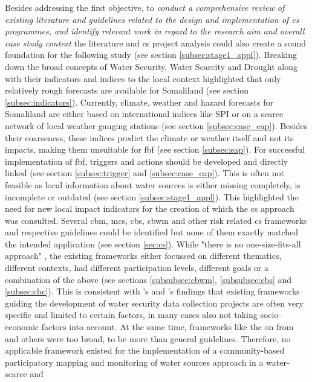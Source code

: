 
Besides addressing the first objective, to \textit{conduct a comprehensive review of existing literature and guidelines related to the design and implementation of \acrlong{cs} programmes, and identify relevant work in regard to the research aim and overall case study context} the literature and \acrshort{cs} project analysis could also create a sound foundation for the following study (see section \ref{subsec:stage1_appl}). %
Breaking down the broad concepts of Water Security, Water Scarcity and Drought along with their indicators and indices to the local context highlighted that only relatively rough forecasts are available for Somaliland (see section \ref{subsec:indicators}). Currently, climate, weather and hazard forecasts for Somaliland are either based on international indices like SPI or on a scarce network of local weather gauging stations (see section \ref*{subsec:case_eap}). Besides their coarseness, these indices predict the climate or weather itself and not its impacts, making them unsuitable for \acrlong{fbf} (see section \ref*{subsec:eap}). For successful implementation of \acrshort{fbf}, triggers and actions should be developed and directly linked (see section \ref{subsec:trigger} and \ref{subsec:case_eap}). This is often not feasible as local information about water sources is either missing completely, is incomplete or outdated (see section \ref{subsec:stage1_appl}). This highlighted the need for new local impact indicators for the creation of which the \acrshort{cs} approach was consulted. Several \acrshort{cbm}, \acrshort{mcs}, \acrshort{cbs}, \acrshort{cbwm} and other risk related \acrshort{cs} frameworks and respective guidelines could be identified but none of them exactly matched the intended application (see section \ref{sec:cs}). While "there is no one-size-fits-all approach" \autocite[2]{fraislCitizenScienceEnvironmental2022}, the existing frameworks either focussed on different thematics, different contexts, had different participation levels, different goals or a combination of the above (see sections \ref{subsubsec:cbwm}, \ref{subsubsec:cbs} and \ref{subsec:cbc}). This is consistent with \autocite{butteFrameworkWaterSecurity2022}'s and \autocite{carrionCROWDSOURCINGWATERQUALITY2020}'s findings that existing frameworks guiding the development of water security data collection projects are often very specific and limited to certain factors, in many cases also not taking socio-economic factors into account. At the same time, frameworks like the on from \autocite{butteFrameworkWaterSecurity2022,eu-citizen.scienceEUCitizenScience,citizenscience.govBasicStepsYour} and others were too broad, to be more than general guidelines. Therefore, no applicable framework existed for the implementation of a community-based participatory mapping and monitoring of water sources approach in a water-scarce and 